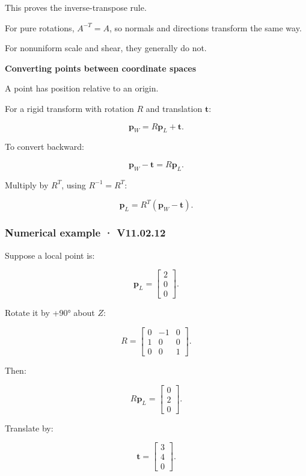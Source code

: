 This proves the inverse-transpose rule.

For pure rotations, \(A^{-T}=A\), so normals and directions transform the same way.

For nonuniform scale and shear, they generally do not.

\textbf{Converting points between coordinate spaces}

A point has position relative to an origin.

For a rigid transform with rotation \(R\) and translation \(\mathbf t\):

\[
 \boxed{ \mathbf p_W=R\mathbf p_L+\mathbf t }.
\]

To convert backward:

\[
 \mathbf p_W-\mathbf t=R\mathbf p_L.
\]

Multiply by \(R^T\), using \(R^{-1}=R^T\):

\[
 \boxed{ \mathbf p_L=R^T(\mathbf p_W-\mathbf t) }.
\]

\subsubsection{Numerical example · V11.02.12}\label{02-foundations-ii-ch032-numerical-example-v11.02.12}

\hypertarget{02-foundations-ii-ch032-numerical-example-v11.02.12}{}

Suppose a local point is:

\[
 \mathbf p_L= \begin{bmatrix}2\\0\\0\end{bmatrix}.
\]

Rotate it by +90° about \(Z\):

\[
 R= \begin{bmatrix} 0&-1&0\\ 1&0&0\\ 0&0&1 \end{bmatrix}.
\]

Then:

\[
 R\mathbf p_L= \begin{bmatrix}0\\2\\0\end{bmatrix}.
\]

Translate by:

\[
 \mathbf t= \begin{bmatrix}3\\4\\0\end{bmatrix}.
\]

